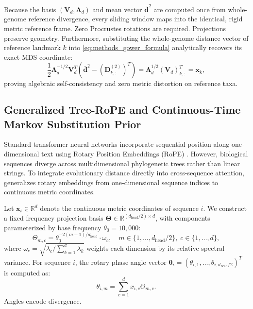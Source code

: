Because the basis $(\mathbf{V}_d, \mathbf{\Lambda}_d)$ and mean vector $\bar{\mathbf{d}}^2$ are computed once from whole-genome reference divergence, every sliding window maps into the identical, rigid metric reference frame.
Zero Procrustes rotations are required.
Projections preserve geometry.
Furthermore, substituting the whole-genome distance vector of reference landmark $k$ into \eqref{eq:methods_gower_formula} analytically recovers its exact MDS coordinate:
\begin{equation}
\frac{1}{2} \mathbf{\Lambda}_d^{-1/2} \mathbf{V}_d^T \left( \bar{\mathbf{d}}^2 - \left( \mathbf{D}^{(2)}_{k, :} \right)^T \right) = \mathbf{\Lambda}_d^{1/2} (\mathbf{V}_d)_{k, :}^T = \mathbf{x}_k,
\label{eq:methods_gower_identity}
\end{equation}
proving algebraic self-consistency and zero metric distortion on reference taxa.

\subsection{Generalized Tree-RoPE and Continuous-Time Markov Substitution Prior}
\label{subsec:methods_treerope_prior}

Standard transformer neural networks incorporate sequential position along one-dimensional text using Rotary Position Embeddings (RoPE) \citep{su2024roformer}.
However, biological sequences diverge across multidimensional phylogenetic trees rather than linear strings.
To integrate evolutionary distance directly into cross-sequence attention, \RhizAeon generalizes rotary embeddings from one-dimensional sequence indices to continuous metric coordinates.

Let $\mathbf{x}_i \in \mathbb{R}^d$ denote the continuous metric coordinates of sequence $i$.
We construct a fixed frequency projection basis $\mathbf{\Theta} \in \mathbb{R}^{(d_{\text{head}}/2) \times d}$, with components parameterized by base frequency $\theta_0 = 10,000$:
\begin{equation}
\Theta_{m, c} = \theta_0^{-2(m-1)/d_{\text{head}}} \cdot \omega_c, \quad m \in \{1, \dots, d_{\text{head}}/2\}, \; c \in \{1, \dots, d\},
\label{eq:methods_freq_basis}
\end{equation}
where $\omega_c = \sqrt{\lambda_c / \sum_{k=1}^d \lambda_k}$ weights each dimension by its relative spectral variance.
For sequence $i$, the rotary phase angle vector $\bm{\theta}_i = (\theta_{i, 1}, \dots, \theta_{i, d_{\text{head}}/2})^T$ is computed as:
\begin{equation}
\theta_{i, m} = \sum_{c=1}^d x_{i, c} \Theta_{m, c}.
\label{eq:methods_tree_rope_angle}
\end{equation}
Angles encode divergence.

